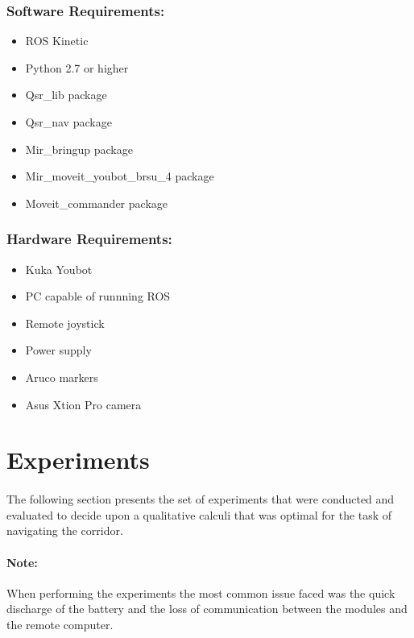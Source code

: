 \subsubsection*{Software Requirements:}
\begin{itemize}
\item ROS Kinetic
\item Python 2.7 or higher
\item Qsr\_lib package
\item Qsr\_nav package
\item Mir\_bringup package 
\item Mir\_moveit\_youbot\_brsu\_4 package 
\item Moveit\_commander package 
\end{itemize}

\subsubsection*{Hardware Requirements:}
\begin{itemize}
	\item Kuka Youbot
	\item PC capable of runnning ROS
	\item Remote joystick 
	\item Power supply 
	\item Aruco markers
	\item Asus Xtion Pro camera
\end{itemize}

 

\section{Experiments}

\paragraph{}The following section presents the set of experiments that were conducted and evaluated to decide upon a qualitative calculi that was optimal for the task of navigating the corridor.

\paragraph{Note:}When performing the experiments the most common issue faced was the quick discharge of the battery and the loss of communication between the modules and the remote computer.
 
